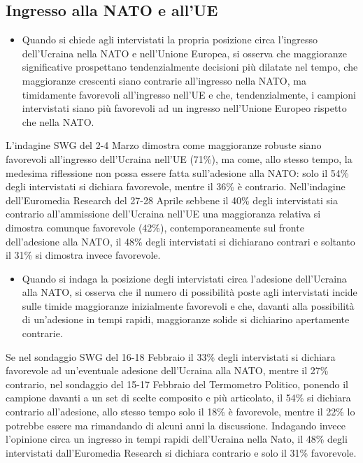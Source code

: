 \documentclass[
]{book}
\providecommand{\tightlist}{%
  \setlength{\itemsep}{0pt}\setlength{\parskip}{0pt}}
\begin{document}
\hypertarget{ingresso-alla-nato-e-allue}{%
\subsection{Ingresso alla NATO e all'UE}\label{ingresso-alla-nato-e-allue}}

\begin{itemize}
\tightlist
\item
  Quando si chiede agli intervistati la propria posizione circa l'ingresso dell'Ucraina nella NATO e nell'Unione Europea, si osserva che maggioranze significative prospettano tendenzialmente decisioni più dilatate nel tempo, che maggioranze crescenti siano contrarie all'ingresso nella NATO, ma timidamente favorevoli all'ingresso nell'UE e che, tendenzialmente, i campioni intervistati siano più favorevoli ad un ingresso nell'Unione Europeo rispetto che nella NATO.
\end{itemize}

L'indagine SWG del 2-4 Marzo dimostra come maggioranze robuste siano favorevoli all'ingresso dell'Ucraina nell'UE (71\%), ma come, allo stesso tempo, la medesima riflessione non possa essere fatta sull'adesione alla NATO: solo il 54\% degli intervistati si dichiara favorevole, mentre il 36\% è contrario.
Nell'indagine dell'Euromedia Research del 27-28 Aprile sebbene il 40\% degli intervistati sia contrario all'ammissione dell'Ucraina nell'UE una maggioranza relativa si dimostra comunque favorevole (42\%), contemporaneamente sul fronte dell'adesione alla NATO, il 48\% degli intervistati si dichiarano contrari e soltanto il 31\% si dimostra invece favorevole.

\begin{itemize}
\tightlist
\item
  Quando si indaga la posizione degli intervistati circa l'adesione dell'Ucraina alla NATO, si osserva che il numero di possibilità poste agli intervistati incide sulle timide maggioranze inizialmente favorevoli e che, davanti alla possibilità di un'adesione in tempi rapidi, maggioranze solide si dichiarino apertamente contrarie.
\end{itemize}

Se nel sondaggio SWG del 16-18 Febbraio il 33\% degli intervistati si dichiara favorevole ad un'eventuale adesione dell'Ucraina alla NATO, mentre il 27\% contrario, nel sondaggio del 15-17 Febbraio del Termometro Politico, ponendo il campione davanti a un set di scelte composito e più articolato, il 54\% si dichiara contrario all'adesione, allo stesso tempo solo il 18\% è favorevole, mentre il 22\% lo potrebbe essere ma rimandando di alcuni anni la discussione.
Indagando invece l'opinione circa un ingresso in tempi rapidi dell'Ucraina nella Nato, il 48\% degli intervistati dall'Euromedia Research si dichiara contrario e solo il 31\% favorevole.
\end{document}
